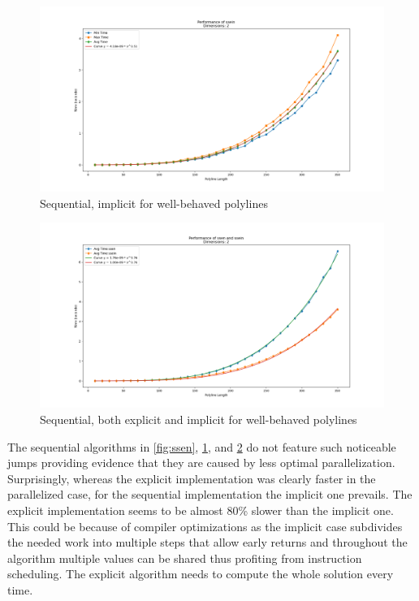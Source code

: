 \begin{figure}[ht]
  \centering
  \includegraphics[scale=0.5, width=\linewidth]{figures/ssein.png}
  \caption{Sequential, implicit for well-behaved polylines}
  \label{fig:ssein}
\end{figure}

\begin{figure}[ht]
  \centering
  \includegraphics[scale=0.5, width=\linewidth]{figures/ssen-ssein.png}
  \caption{Sequential, both explicit and implicit for well-behaved polylines}
  \label{fig:ssen-ssein}
\end{figure}

The sequential algorithms in \cref{fig:ssen}, \cref{fig:ssein}, and \cref{fig:ssen-ssein}  do not feature such noticeable jumps providing evidence that they are caused by less optimal parallelization. Surprisingly, whereas the explicit implementation was clearly faster in the parallelized case, for the sequential implementation the implicit one prevails. The explicit implementation seems to be almost 80\% slower than the implicit one. This could be because of compiler optimizations as the implicit case subdivides the needed work into multiple steps that allow early returns and throughout the algorithm multiple values can be shared thus profiting from instruction scheduling. The explicit algorithm needs to compute the whole solution every time.


